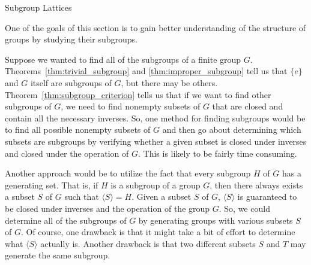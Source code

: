 \begin{section}{Subgroup Lattices}


One of the goals of this section is to gain better understanding of the structure of groups by studying their subgroups. 

Suppose we wanted to find all of the subgroups of a finite group $G$. Theorems~\ref{thm:trivial_subgroup} and \ref{thm:improper_subgroup} tell us that $\{e\}$ and $G$ itself are subgroups of $G$, but there may be others.  Theorem~\ref{thm:subgroup_criterion} tells us that if we want to find other subgroups of $G$, we need to find nonempty subsets of $G$ that are closed and contain all the necessary inverses.  So, one method for finding subgroups would be to find all possible nonempty subsets of $G$ and then go about determining which subsets are subgroups by verifying whether a given subset is closed under inverses and closed under the operation of $G$. This is likely to be fairly time consuming.

Another approach would be to utilize the fact that every subgroup $H$ of $G$ has a generating set.  That is, if $H$ is a subgroup of a group $G$, then there always exists a subset $S$ of $G$ such that $\langle S\rangle=H$. Given a subset $S$ of $G$, $\langle S\rangle$ is guaranteed to be closed under inverses and the operation of the group $G$.  So, we could determine all of the subgroups of $G$ by generating groups with various subsets $S$ of $G$. Of course, one drawback is that it might take a bit of effort to determine what $\langle S\rangle$ actually is. Another drawback is that two different subsets $S$ and $T$ may generate the same subgroup.


\end{section}
